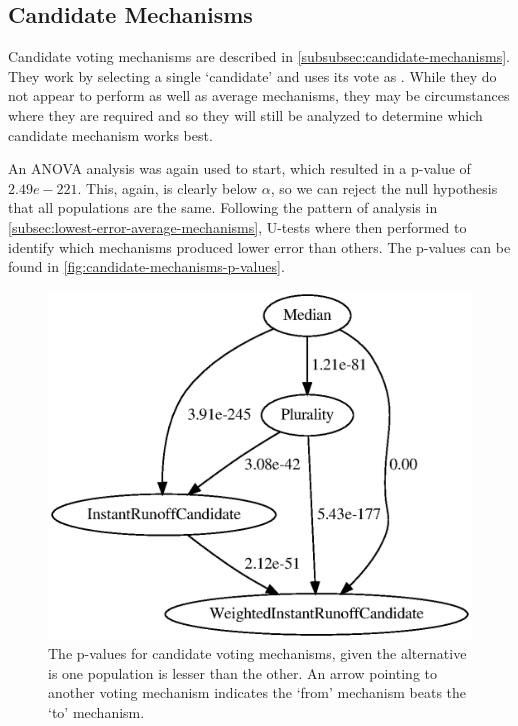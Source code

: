\subsection{Candidate Mechanisms}\label{subsec:lowest-error-candidate-mechanisms}
Candidate voting mechanisms are described in \autoref{subsubsec:candidate-mechanisms}.
They work by selecting a single `candidate' and uses its vote as \systemtruth.
While they do not appear to perform as well as average mechanisms, they may be
circumstances where they are required and so they will still be analyzed to determine
which candidate mechanism works best.

An ANOVA analysis was again used to start, which resulted in a p-value of
$2.49e-221$.
This, again, is clearly below $\alpha$, so we can reject the null hypothesis that all
populations are the same.
Following the pattern of analysis in
\autoref{subsec:lowest-error-average-mechanisms}, U-tests where then performed to
identify which mechanisms produced lower error than others.
The p-values can be found in \autoref{fig:candidate-mechanisms-p-values}.

\begin{figure}[htbp]
    \centering
    \includegraphics[scale=0.75]
    {./content/figures/voting_mechanisms/candidate-mechanisms-p-values.gv}
    \caption{The p-values for candidate voting mechanisms, given the alternative is one
    population is lesser than the other.
    An arrow pointing to another voting mechanism indicates the `from' mechanism
    beats the `to' mechanism.}
    \label{fig:candidate-mechanisms-p-values}
\end{figure}

